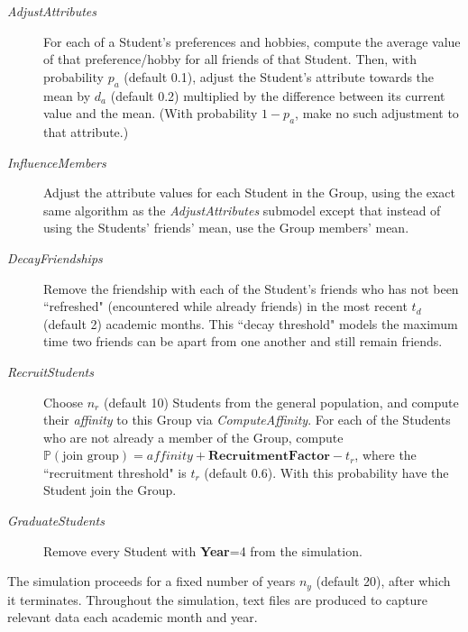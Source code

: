 \begin{description}
\item[\textsl{AdjustAttributes}] For each of a Student's preferences and
hobbies, compute the average value of that preference/hobby for all friends of
that Student. Then, with probability $p_a$ (default 0.1), adjust the Student's
attribute towards the mean by $d_a$ (default 0.2) multiplied by the difference between its current
value and the mean. (With probability $1-p_a$, make no such adjustment to that
attribute.)

\item[\textsl{InfluenceMembers}] Adjust the attribute values for each Student
in the Group, using the exact same algorithm as the \textsl{AdjustAttributes}
submodel except that instead of using the Students' friends' mean, use the
Group members' mean.

\item[\textsl{DecayFriendships}] Remove the friendship with each of the
Student's friends who has not been ``refreshed" (encountered while already
friends) in the most recent $t_d$ (default 2) academic months. This ``decay threshold"
models the maximum time two friends can be apart from one another and still
remain friends.

\item[\textsl{RecruitStudents}] Choose $n_r$ (default 10) Students from the general
population, and compute their \textit{affinity} to this Group via
\textsl{ComputeAffinity}. For each of the Students who are not already a
member of the Group, compute $\mathbb{P}(\text{join group})= \textit{affinity}
+ \textbf{RecruitmentFactor} - t_r$, where the ``recruitment threshold" is
$t_r$ (default 0.6). 
With this probability have the Student join the Group.

\item[\textsl{GraduateStudents}] Remove every Student with \textbf{Year}=4 from the
simulation.

\end{description}

The simulation proceeds for a fixed number of years $n_y$ (default 20), after which it terminates.
Throughout the simulation, text files are produced to capture relevant data
each academic month and year.

